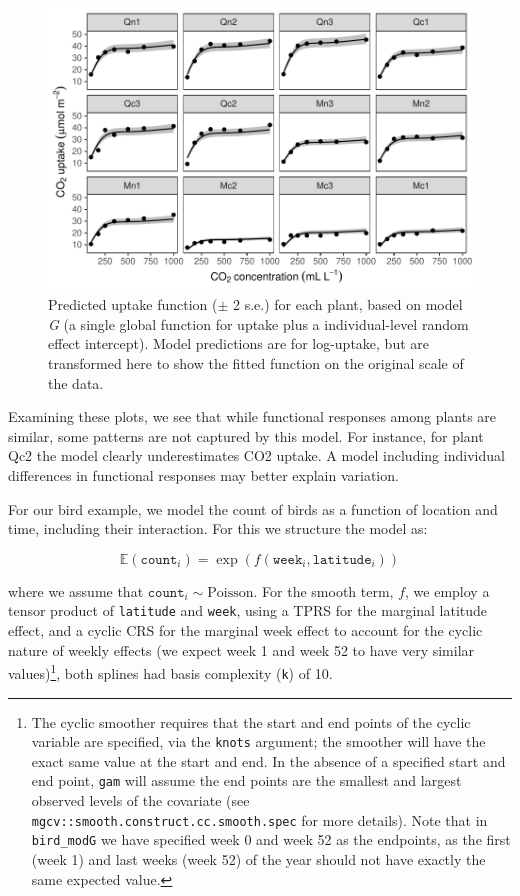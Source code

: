 \documentclass[12pt]{article}
\let\rmarkdownfootnote\footnote%
\def\footnote{\protect\rmarkdownfootnote}
\begin{document}
\begin{figure}
\includegraphics[width=\linewidth]{../figures/co2_modG_ggplot-1} \caption{\label{fig:co2_modG_predict} Predicted uptake function ($\pm$ 2 s.e.) for each plant, based on model \emph{G} (a single global function for uptake plus a individual-level random effect intercept). Model predictions are for log-uptake, but are transformed here to show the fitted function on the original scale of the data.}\label{fig:co2_modG_ggplot}
\end{figure}

Examining these plots, we see that while functional responses among
plants are similar, some patterns are not captured by this model. For
instance, for plant Qc2 the model clearly underestimates CO2 uptake. A
model including individual differences in functional responses may
better explain variation.

For our bird example, we model the count of birds as a function of
location and time, including their interaction. For this we structure
the model as:

\[
\mathbb{E}(\texttt{count}_i) = \exp(f(\texttt{week}_i, \texttt{latitude}_i))
\]

where we assume that \(\texttt{count}_i \sim\text{Poisson}\). For the
smooth term, \(f\), we employ a tensor product of \texttt{latitude} and
\texttt{week}, using a TPRS for the marginal latitude effect, and a
cyclic CRS for the marginal week effect to account for the cyclic nature
of weekly effects (we expect week 1 and week 52 to have very similar
values)\footnote{The cyclic smoother requires that the start and end
  points of the cyclic variable are specified, via the \texttt{knots}
  argument; the smoother will have the exact same value at the start and
  end. In the absence of a specified start and end point, \texttt{gam}
  will assume the end points are the smallest and largest observed
  levels of the covariate (see
  \texttt{mgcv::smooth.construct.cc.smooth.spec} for more details). Note
  that in \texttt{bird\_modG} we have specified week 0 and week 52 as
  the endpoints, as the first (week 1) and last weeks (week 52) of the
  year should not have exactly the same expected value.}, both splines
had basis complexity (\texttt{k}) of 10.
\end{document}
